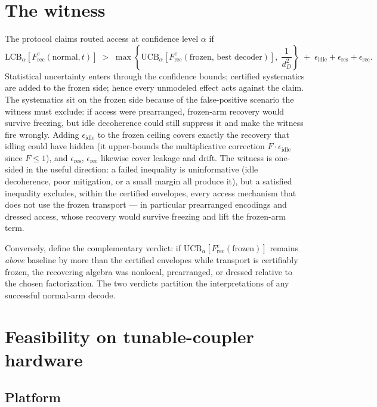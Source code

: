 \documentclass[11pt]{article}
\newcommand{\Frec}{F^{e}_{\mathrm{rec}}}
\newcommand{\LCB}{\mathrm{LCB}}
\newcommand{\UCB}{\mathrm{UCB}}
\begin{document}
\section{The witness}
\label{sec:witness}

The protocol claims routed access at confidence level $\alpha$ if
\begin{equation}
  \LCB_\alpha\!\left[ \Frec(\text{normal}, t) \right]
  \;>\;
  \max\!\left\{
    \UCB_\alpha\!\left[ \Frec(\text{frozen, best decoder}) \right],\;
    \frac{1}{d_D^2}
  \right\}
  \;+\;
  \epsilon_{\mathrm{idle}}
  + \epsilon_{\mathrm{res}}
  + \epsilon_{\mathrm{rec}} .
  \label{eq:witness}
\end{equation}
Statistical uncertainty enters through the confidence bounds;
certified systematics are added to the frozen side; hence every
unmodeled effect acts against the claim.  The systematics sit on the
frozen side because of the false-positive scenario the witness must
exclude: if access were prearranged, frozen-arm recovery would
survive freezing, but idle decoherence could still suppress it and
make the witness fire wrongly.  Adding $\epsilon_{\mathrm{idle}}$ to
the frozen ceiling covers exactly the recovery that idling could
have hidden (it upper-bounds the multiplicative correction
$F \cdot \epsilon_{\mathrm{idle}}$ since $F \le 1$), and
$\epsilon_{\mathrm{res}}$, $\epsilon_{\mathrm{rec}}$ likewise cover
leakage and drift.  The witness is one-sided in
the useful direction: a failed inequality is uninformative (idle
decoherence, poor mitigation, or a small margin all produce it), but
a satisfied inequality excludes, within the certified envelopes,
every access mechanism that does not use the frozen transport ---
in particular prearranged encodings and dressed access, whose
recovery would survive freezing and lift the frozen-arm term.

Conversely, define the complementary verdict: if
$\UCB_\alpha[\Frec(\text{frozen})]$ remains \emph{above} baseline by
more than the certified envelopes while transport is certifiably
frozen, the recovering algebra was nonlocal, prearranged, or dressed
relative to the chosen factorization.  The two verdicts partition
the interpretations of any successful normal-arm decode.

\section{Feasibility on tunable-coupler hardware}
\label{sec:feasibility}

\subsection{Platform}
\end{document}
